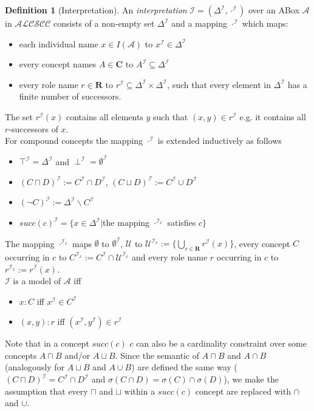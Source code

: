 \documentclass{book}
\theoremstyle{break}
\theoremstyle{definition}
\newtheorem{mydef}{Definition}
\begin{document}
\begin{mydef}[Interpretation]
An \textit{interpretation} $\mathcal{I}=(\Delta^\mathcal{I},\cdot^\mathcal{I})$ over an ABox $\mathcal{A}$ in $\mathcal{ALCSCC}$ consists of a non-empty set $\Delta^\mathcal{I}$ and a mapping $\cdot^\mathcal{I}$ which maps:
\begin{itemize}
\item each individual name $x\in I(\mathcal{A})$ to $x^\mathcal{I}\in \Delta^\mathcal{I}$
\item every concept names $A\in\mathbf{C}$ to $A^\mathcal{I}\subseteq \Delta^\mathcal{I}$
\item every role name $r\in\mathbf{R}$ to $r^\mathcal{I}\subseteq\Delta^\mathcal{I}\times\Delta^\mathcal{I}$, such that every element in $\Delta^\mathcal{I}$ has a finite number of successors.
\end{itemize}
The set $r^\mathcal{I}(x)$ contains all elements $y$ such that $(x,y)\in r^\mathcal{I}$ e.g. it contains all $r$-successors of $x$.\\
For compound concepts the mapping $\cdot^\mathcal{I}$ is extended inductively as follows
\begin{itemize}
\item $\top^\mathcal{I}=\Delta^\mathcal{I}$ and $\perp^\mathcal{I}=\emptyset^\mathcal{I}$
\item $(C\sqcap D)^\mathcal{I}:=C^\mathcal{I}\cap D^\mathcal{I}$, $(C\sqcup D)^\mathcal{I}:=C^\mathcal{I}\cup D^\mathcal{I}$
\item $(\neg C)^\mathcal{I}:=\Delta^\mathcal{I}\backslash C^\mathcal{I}$
\item $succ(c)^\mathcal{I}=\{x\in \Delta^\mathcal{I}|$the mapping $\cdot^{\mathcal{I}_x}$ satisfies $c\}$
\end{itemize}
The mapping $\cdot^{\mathcal{I}_x}$ maps $\emptyset$ to $\emptyset^\mathcal{I}$, $\mathcal{U}$ to $\mathcal{U}^{\mathcal{I}_x}:=\{\bigcup_{r\in\mathbf{R}}r^\mathcal{I}(x)\}$, every concept $C$ occurring in $c$ to $C^{\mathcal{I}_x}:=C^\mathcal{I}\cap \mathcal{U}^{\mathcal{I}_x}$ and every role name $r$ occurring in $c$ to $r^{\mathcal{I}_x}:=r^\mathcal{I}(x)$.\\
$\mathcal{I}$ is a model of $\mathcal{A}$ iff
\begin{itemize}
\item $x:C$ iff $x^\mathcal{I}\in C^\mathcal{I}$ 
\item $(x,y):r$ iff $(x^\mathcal{I},y^\mathcal{I})\in r^\mathcal{I}$
\end{itemize} 
\end{mydef}
Note that in a concept $succ(c)$ $c$ can also be a cardinality constraint over some concepts $A\sqcap B$ and/or $A\sqcup B$. Since the semantic of $A\sqcap B$ and $A\cap B$ (analogously for $A\sqcup B$ and $A\cup B$) are defined the same way ($(C\sqcap D)^\mathcal{I}=C^\mathcal{I}\cap D^\mathcal{I}$ and $\sigma(C\cap D)=\sigma(C)\cap\sigma(D)$), we make the assumption that every $\sqcap$ and $\sqcup$ within a $succ(c)$ concept are replaced with $\cap$ and $\cup$.
\end{document}
